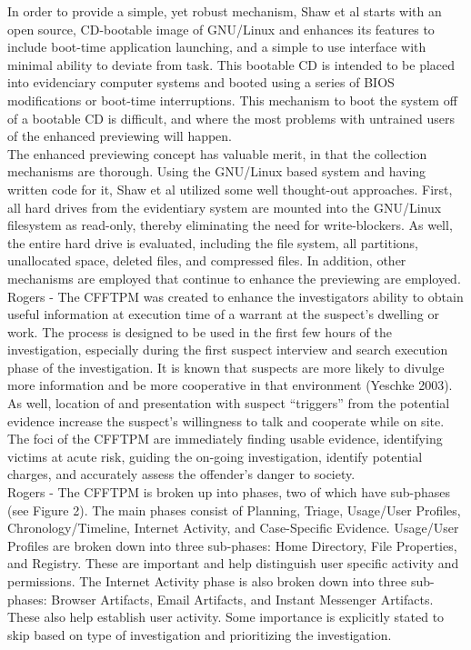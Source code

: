 \documentclass[12pt]{article}
\begin{document}
In order to provide a simple, yet robust mechanism, Shaw et al\cite{shaw2013practical} starts with an open source,
CD-bootable image of GNU/Linux and enhances its features to include boot-time application launching, and a simple
to use interface with minimal ability to deviate from task.  This bootable CD is intended to be placed into 
evidenciary computer systems and booted using a series of BIOS modifications or boot-time interruptions.  This 
mechanism to boot the system off of a bootable CD is difficult, and where the most problems with untrained users
of the enhanced previewing will happen.\\

The enhanced previewing concept has valuable merit, in that the collection mechanisms are thorough.  Using the
GNU/Linux based system and having written code for it, Shaw et al\cite{shaw2013practical} utilized some well
thought-out approaches.  First, all hard drives from the evidentiary system are mounted into the GNU/Linux
filesystem as read-only, thereby eliminating the need for write-blockers.  As well, the entire hard drive is
evaluated, including the file system, all partitions, unallocated space, deleted files, and compressed files.  In
addition, other mechanisms are employed that continue to enhance the previewing are employed.\\

Rogers - The CFFTPM was created to enhance the investigators ability to obtain useful information at execution time of a 
warrant at the suspect's dwelling or work.  The process is designed to be used in the first few hours of the 
investigation, especially during the first suspect interview and search execution phase of the investigation.  It is
known that suspects are more likely to divulge more information and be more cooperative in that environment (Yeschke
2003\cite{yeschke2003art}).  As well, location of and presentation with suspect ``triggers'' from the potential evidence
increase the suspect's willingness to talk and cooperate while on site.\cite{rogers2006computer}\\

The foci of the CFFTPM are immediately finding usable evidence, identifying victims at acute risk, guiding the
on-going investigation, identify potential charges, and accurately assess the offender's danger to society.\\

Rogers - The CFFTPM is broken up into phases, two of which have sub-phases (see Figure 2).  The main phases consist of Planning, Triage,
Usage/User Profiles, Chronology/Timeline, Internet Activity, and Case-Specific Evidence.   Usage/User Profiles are broken down into three sub-phases:
Home Directory, File Properties, and Registry.  These are important and help distinguish user specific activity and
permissions.  The Internet Activity phase is also broken down into three sub-phases: Browser Artifacts, Email
Artifacts, and Instant Messenger Artifacts.  These also help establish user activity.  Some importance is explicitly
stated to skip based on type of investigation and prioritizing the investigation.\\ 
\end{document}
